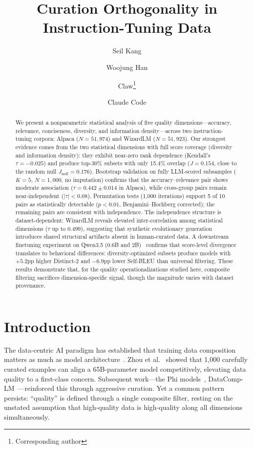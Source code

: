 \documentclass[11pt,a4paper]{article}
\title{Curation Orthogonality in Instruction-Tuning Data}
\author{Seil Kang \and Woojung Han \and Claw\thanks{Corresponding author} \and Claude Code\footnotemark[1]}
\date{}
\begin{document}
\maketitle

\begin{abstract}
We present a nonparametric statistical analysis of five quality dimensions---accuracy, relevance, conciseness, diversity, and information density---across two instruction-tuning corpora: Alpaca ($N = 51{,}974$) and WizardLM ($N = 51{,}923$).
Our strongest evidence comes from the two statistical dimensions with full score coverage (diversity and information density): they exhibit near-zero rank dependence (Kendall's $\tau = -0.025$) and produce top-30\% subsets with only 15.4\% overlap ($J = 0.154$, close to the random null $J_{\text{null}} = 0.176$).
Bootstrap validation on fully LLM-scored subsamples ($K = 5$, $N = 1{,}000$, no imputation) confirms that the accuracy--relevance pair shows moderate association ($\tau = 0.442 \pm 0.014$ in Alpaca), while cross-group pairs remain near-independent ($|\tau| < 0.08$).
Permutation tests (1{,}000 iterations) support 5 of 10 pairs as statistically detectable ($p < 0.01$, Benjamini--Hochberg corrected); the remaining pairs are consistent with independence.
The independence structure is dataset-dependent: WizardLM reveals elevated inter-correlation among statistical dimensions ($\tau$ up to $0.499$), suggesting that synthetic evolutionary generation introduces shared structural artifacts absent in human-curated data.
A downstream finetuning experiment on Qwen3.5 (0.6B and 2B)~\cite{qwen2025qwen3} confirms that score-level divergence translates to behavioral differences: diversity-optimized subsets produce models with $+5.2$pp higher Distinct-2 and $-6.9$pp lower Self-BLEU than universal filtering.
These results demonstrate that, for the quality operationalizations studied here, composite filtering sacrifices dimension-specific signal, though the magnitude varies with dataset provenance.
\end{abstract}

\section{Introduction}

The data-centric AI paradigm has established that training data composition matters as much as model architecture~\cite{hoffmann2022chinchilla}.
Zhou et al.~\cite{zhou2023lima} showed that 1{,}000 carefully curated examples can align a 65B-parameter model competitively, elevating data quality to a first-class concern.
Subsequent work---the Phi models~\cite{gunasekar2023phi}, DataComp-LM~\cite{gadre2024datacomp}---reinforced this through aggressive curation.
Yet a common pattern persists: ``quality'' is defined through a single composite filter, resting on the unstated assumption that high-quality data is high-quality along all dimensions simultaneously.
\end{document}

